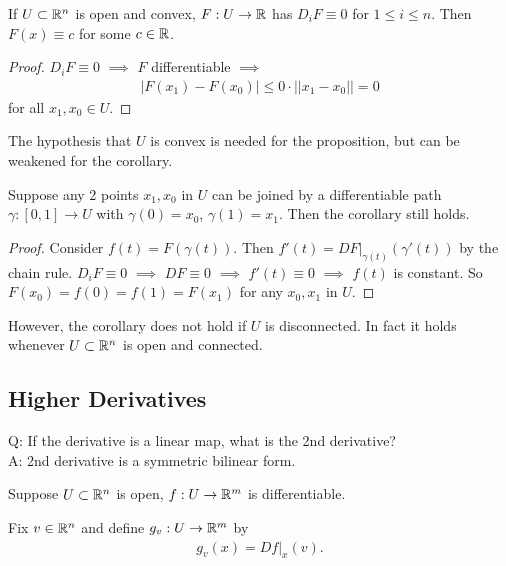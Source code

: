 \documentclass[a4paper]{article}
\begin{document}
\begin{coro}
If $U \subset \mathbb{R}^n$ is open and convex, $F:U \to \mathbb{R}$ has $D_i F \equiv 0$ for $1 \leq i \leq n$. Then $F(x) \equiv c$ for some $c \in \mathbb{R}$.
\begin{proof}
$D_i F \equiv 0$ $\implies$ $F$ differentiable $\implies$
\begin{equation*}
\begin{aligned}
|F(x_1)-F(x_0)|\leq 0\cdot ||x_1-x_0|| = 0
\end{aligned}
\end{equation*}
for all $x_1,x_0 \in U$.
\end{proof}
\end{coro}

\begin{rem}
The hypothesis that $U$ is convex is needed for the proposition, but can be weakened for the corollary.
\end{rem}
\begin{eg}
Suppose any 2 points $x_1,x_0$ in $U$ can be joined by a differentiable path $\gamma:[0,1] \to U$ with $\gamma(0)=x_0$, $\gamma(1) = x_1$. Then the corollary still holds.
\begin{proof}
Consider $f(t)=F(\gamma(t))$. Then $f'(t) = DF|_{\gamma(t)}(\gamma'(t))$ by the chain rule. $D_i F \equiv 0$ $\implies$ $DF \equiv 0$ $\implies$ $f'(t) \equiv 0$ $\implies$ $f(t)$ is constant. So $F(x_0) = f(0) = f(1)=F(x_1)$ for any $x_0,x_1$ in $U$.
\end{proof}
\end{eg}

However, the corollary does not hold if $U$ is disconnected. In fact it holds whenever $U \subset \mathbb{R}^n$ is open and connected.

\subsection{Higher Derivatives}
Q: If the derivative is a linear map, what is the 2nd derivative?\\
A: 2nd derivative is a symmetric bilinear form.

Suppose $U \subset \mathbb{R}^n$ is open, $f:U \to \mathbb{R}^m$ is differentiable.

Fix $v \in \mathbb{R}^n$ and define $g_v:U \to \mathbb{R}^m$ by
\begin{equation*}
\begin{aligned}
g_v(x)=Df|_x(v).
\end{aligned}
\end{equation*}
\end{document}
